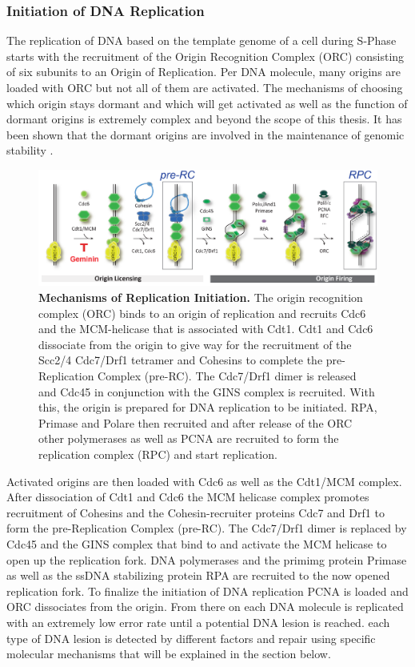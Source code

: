 \subsubsection{Initiation of DNA Replication}
\label{sec:cellcycle}
The replication of DNA based on the template genome of a cell during S-Phase starts with the recruitment of the Origin Recognition Complex (ORC) consisting of six subunits to an Origin of Replication. Per DNA molecule, many origins are loaded with ORC but not all of them are activated. The mechanisms of choosing which origin stays dormant and which will get activated as well as the function of dormant origins is extremely complex and beyond the scope of this thesis. It has been shown that the dormant origins are involved in the maintenance of genomic stability \citep{Alver.2014}.
\begin{figure}[H]
    \centering
    \includegraphics[width=\textwidth]{resources/images/Intro/repIni.png}
    \caption[Mechanisms of Replication Initiation]{\textbf{Mechanisms of Replication Initiation. } The origin recognition complex (ORC) binds to an origin of replication and recruits Cdc6 and the MCM-helicase that is associated with Cdt1. Cdt1 and Cdc6 dissociate from the origin to give way for the recruitment of the Scc2/4 Cdc7/Drf1 tetramer and Cohesins to complete the pre-Replication Complex (pre-RC). The Cdc7/Drf1 dimer is released and Cdc45 in conjunction with the GINS complex is recruited. With this, the origin  is prepared for DNA replication to be initiated. RPA, Primase and Pol\textalpha are then recruited and after release of the ORC other polymerases as well as PCNA are recruited to form the replication complex (RPC) and start replication.\\\citep{Raschle.2015}}
    \label{fig:replication_overview}
\end{figure}
Activated origins are then loaded with Cdc6 as well as the Cdt1/MCM complex. After dissociation of Cdt1 and Cdc6 the MCM helicase complex promotes recruitment of Cohesins and the Cohesin-recruiter proteins Cdc7 and Drf1 to form the pre-Replication Complex (pre-RC). The Cdc7/Drf1 dimer is replaced by Cdc45 and the GINS complex that bind to and activate the MCM helicase to open up the replication fork. DNA polymerases and the primimg protein Primase as well as the ssDNA stabilizing protein RPA are recruited to the now opened replication fork. To finalize the initiation of DNA replication PCNA is loaded and ORC dissociates from the origin. From there on each DNA molecule is replicated with an extremely low error rate until a potential DNA lesion is reached. each type of DNA lesion is detected by different factors and repair using specific molecular mechanisms that will be explained in the section below.\newpage

